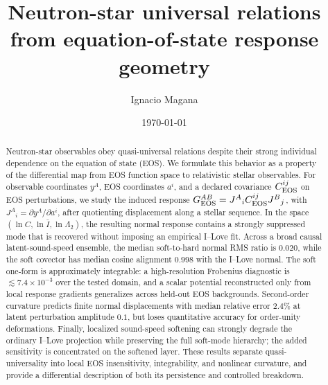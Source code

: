 \documentclass[aps,prd,onecolumn,nofootinbib,superscriptaddress]{revtex4-2}
\begin{document}
\title{Neutron-star universal relations from equation-of-state response geometry}
\author{Ignacio Magana}
\date{\today}

\begin{abstract}
Neutron-star observables obey quasi-universal relations despite their strong
individual dependence on the equation of state (EOS). We formulate this
behavior as a property of the differential map from EOS function space to
relativistic stellar observables. For observable coordinates \(y^A\), EOS
coordinates \(a^i\), and a declared covariance \(C_{\rm EOS}^{ij}\) on EOS
perturbations, we study the induced response
\(G_{\rm EOS}^{AB}=J^A{}_iC_{\rm EOS}^{ij}J^B{}_j\), with
\(J^A{}_i=\partial y^A/\partial a^i\), after quotienting displacement along a
stellar sequence. In the space
\((\ln C,\ln\bar I,\ln\Lambda_2)\), the resulting normal response contains a
strongly suppressed mode that is recovered without imposing an empirical
I--Love fit. Across a broad causal latent-sound-speed ensemble, the median
soft-to-hard normal RMS ratio is \(0.020\), while the soft covector has median
cosine alignment \(0.998\) with the I--Love normal. The soft one-form is
approximately integrable: a high-resolution Frobenius diagnostic is
\(\lesssim7.4\times10^{-3}\) over the tested domain, and a scalar potential
reconstructed only from local response gradients generalizes across held-out
EOS backgrounds. Second-order curvature predicts finite normal
displacements with median relative error \(2.4\%\) at latent perturbation
amplitude \(0.1\), but loses quantitative accuracy for order-unity
deformations. Finally, localized sound-speed softening can strongly degrade
the ordinary I--Love projection while preserving the full soft-mode
hierarchy; the added sensitivity is concentrated on the softened layer.
These results separate quasi-universality into local EOS insensitivity,
integrability, and nonlinear curvature, and provide a differential
description of both its persistence and controlled breakdown.
\end{abstract}

\maketitle









\end{document}
